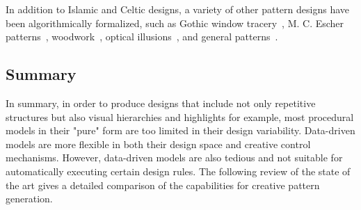 In addition to Islamic and Celtic designs, a variety of other pattern designs have been algorithmically formalized, such as Gothic window tracery~\cite{havemann_2004_gpd}, M. C. Escher patterns~\cite{dunham_1981_crh,kaplan_2004_isp}, woodwork~\cite{gulati_2010_acp,gulati_2012_acp}, optical illusions~\cite{chi_2014_ois}, and general patterns~\cite{ouyang_2015_cat,gdawiec_2017_pga}.



\subsection{Summary}
\label{subsec:models_summary}

In summary, in order to produce designs that include not only repetitive structures but also visual hierarchies and highlights for example, most procedural models in their "pure" form are too limited in their design variability. Data-driven models are more flexible in both their design space and creative control mechanisms. However, data-driven models are also tedious and not suitable for automatically executing certain design rules. The following review of the state of the art gives a detailed comparison of the capabilities for creative pattern generation.